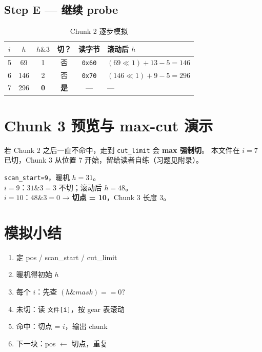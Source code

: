 \subsection{Step E — 继续 probe}

\begin{table}[htbp]
\centering
\caption{Chunk 2 逐步模拟}
\small
\begin{tabular}{@{}cccccp{3.5cm}@{}}
\toprule
\textbf{$i$} & \textbf{$h$} & \textbf{$h\&3$} & \textbf{切？} & \textbf{读字节} & \textbf{滚动后 $h$} \\
\midrule
5 & 69 & 1 & 否 & \texttt{0x60} & $(69\!\ll\!1)+13-5=146$ \\
6 & 146 & 2 & 否 & \texttt{0x70} & $(146\!\ll\!1)+9-5=296$ \\
7 & 296 & \textcolor{CutRed}{\textbf{0}} & \textcolor{CutRed}{\textbf{是}} & — & — \\
\bottomrule
\end{tabular}
\end{table}

\section{Chunk 3 预览与 max-cut 演示}

若 Chunk 2 之后一直不命中，走到 \texttt{cut\_limit} 会 \textbf{max 强制切}。
本文件在 $i=7$ 已切，Chunk 3 从位置 7 开始，留给读者自练（习题见附录）。

\begin{simbox}[自练：Chunk 3 从 pos=7 开始]
\texttt{scan\_start=9}，暖机 $h=31$。\\
$i=9$：$31\&3=3$ 不切；滚动后 $h=48$。\\
$i=10$：$48\&3=0$ → \textbf{切点 = 10}，Chunk 3 长度 3。
\end{simbox}

\section{模拟小结}

\begin{genonebox}
\begin{enumerate}[nosep]
  \item 定 pos / scan\_start / cut\_limit
  \item 暖机得初始 $h$
  \item 每个 $i$：先查 $(h \& mask)==0?$
  \item 未切：读 \texttt{文件[i]}，按 gear 表滚动
  \item 命中：切点 = $i$，输出 chunk
  \item 下一块：pos $\leftarrow$ 切点，重复
\end{enumerate}
\end{genonebox}
